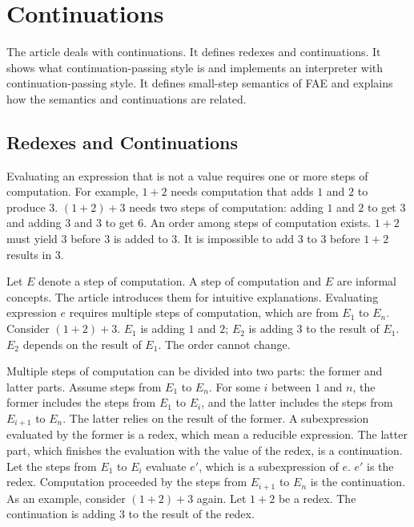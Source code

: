 \setchapterpreamble[u]{\margintoc}
\chapter{Continuations}

The article deals with continuations. It defines redexes and continuations. It
shows what continuation-passing style is and implements an interpreter with
continuation-passing style. It defines small-step semantics of FAE and explains
how the semantics and continuations are related.

\section{Redexes and Continuations}

Evaluating an expression that is not a value requires one or more steps of
computation. For example, $1+2$ needs computation that adds $1$ and $2$ to
produce $3$. $(1+2)+3$ needs two steps of computation: adding $1$ and $2$ to get
$3$ and adding $3$ and $3$ to get $6$. An order among steps of computation
exists. $1+2$ must yield $3$ before $3$ is added to $3$. It is impossible to add
$3$ to $3$ before $1+2$ results in $3$.

Let $E$ denote a step of computation. A step of computation and $E$ are informal
concepts. The article introduces them for intuitive explanations. Evaluating
expression $e$ requires multiple steps of computation, which are from $E_1$ to
$E_n$. Consider $(1+2)+3$. $E_1$ is adding $1$ and $2$; $E_2$ is adding $3$ to
the result of $E_1$. $E_2$ depends on the result of $E_1$. The order cannot
change.

Multiple steps of computation can be divided into two parts: the former and
latter parts. Assume steps from $E_1$ to $E_n$. For some $i$ between $1$ and $n$,
the former includes the steps from $E_1$ to $E_i$, and the latter includes the
steps from $E_{i+1}$ to $E_n$. The latter relies on the result of the former. A
subexpression evaluated by the former is a redex, which mean a reducible
expression. The latter part, which finishes the evaluation with the value of the
redex, is a continuation. Let the steps from $E_1$ to $E_i$ evaluate $e'$, which
is a subexpression of $e$. $e'$ is the redex. Computation proceeded by the steps
from $E_{i+1}$ to $E_n$ is the continuation. As an example, consider $(1+2)+3$
again. Let $1+2$ be a redex. The continuation is adding $3$ to the result of the
redex.

